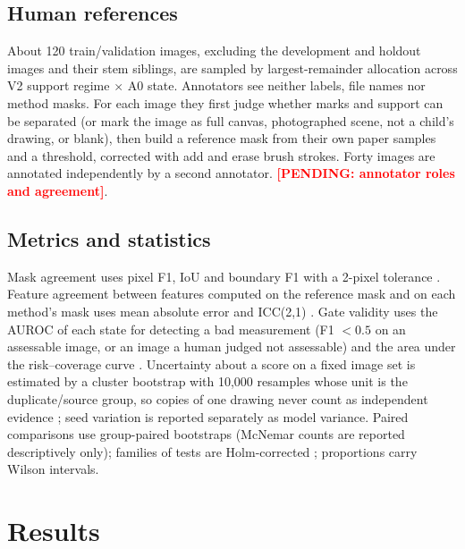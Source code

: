 \documentclass[pdflatex,sn-mathphys-num]{sn-jnl}
\newcommand{\pending}[1]{\textcolor{red}{\textbf{[PENDING: #1]}}}
\begin{document}
\subsection{Human references}\label{sec:m-ref}
About 120 train/validation images, excluding the development and holdout images and their stem siblings, are sampled by largest-remainder allocation across V2 support regime $\times$ A0 state. Annotators see neither labels, file names nor method masks. For each image they first judge whether marks and support can be separated (or mark the image as full canvas, photographed scene, not a child's drawing, or blank), then build a reference mask from their own paper samples and a threshold, corrected with add and erase brush strokes. Forty images are annotated independently by a second annotator. \pending{annotator roles and agreement}.

\subsection{Metrics and statistics}\label{sec:m-stats}
Mask agreement uses pixel F1, IoU and boundary F1 with a 2-pixel tolerance \cite{csurka2013good}. Feature agreement between features computed on the reference mask and on each method's mask uses mean absolute error and ICC(2,1) \cite{shrout1979icc,koo2016icc}. Gate validity uses the AUROC of each state for detecting a bad measurement (F1 $<0.5$ on an assessable image, or an image a human judged not assessable) and the area under the risk--coverage curve \cite{geifman2017selective}. Uncertainty about a score on a fixed image set is estimated by a cluster bootstrap with 10,000 resamples whose unit is the duplicate/source group, so copies of one drawing never count as independent evidence \cite{efron1994bootstrap}; seed variation is reported separately as model variance. Paired comparisons use group-paired bootstraps (McNemar counts are reported descriptively only); families of tests are Holm-corrected \cite{holm1979simple}; proportions carry Wilson intervals.

\section{Results}\label{sec:results}
\end{document}

